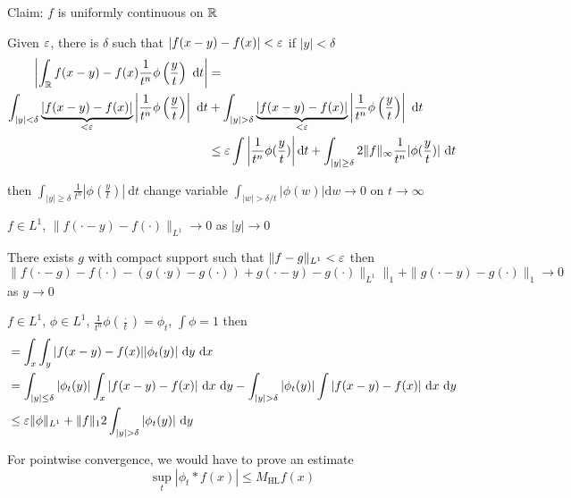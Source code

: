 Claim: $f$ is uniformly continuous on $\mathbb R$

Given $\varepsilon$, there is $\delta$ such that $|f(x-y) - f(x)| < \varepsilon$ if $|y| < \delta$
\begin{align*}
  \left|\int_\mathbb R f(x-y) - f(x) \frac1{t^n} \phi\left(\frac yt\right) \ \mathrm{d}t\right| &= \\
  \int_{|y| < \delta} \underbrace{|f(x-y) - f(x)|}_{< \varepsilon} \left|\frac1{t^n} \phi\left(\frac yt\right)\right| \ \mathrm{d}t& + \int_{|y| > \delta} \underbrace{|f(x-y) - f(x)|}_{< \varepsilon} \left|\frac1{t^n} \phi\left(\frac yt\right)\right| \ \mathrm{d}t\\
  &\le \varepsilon \int \left|\frac1{t^n} \phi(\frac yt)\right| \mathrm{d}t + \int_{|y| \ge \delta} 2 \|f\|_{\infty} \frac{1}{t^n} |\phi(\frac yt)| \ \mathrm{d}t \\
\end{align*}

then $\int_{|y| \ge \delta} \frac1{t^n} |\phi(\frac yt)| \ \mathrm{d}t$ change variable
$\int_{|w| > \delta /t} |\phi(w)| \mathrm{d}w \to 0$ on $t \to \infty$

$f \in L^1$, $\|f(\cdot - y) - f(\cdot)\|_{L^1} \to 0$ as $|y| \to 0$

There exists $g$ with compact support such that $\|f-g\|_{L^1} < \varepsilon$
then 
\[\|f(\cdot - g) - f(\cdot) -(g(\cdot y) - g(\cdot)) + g(\cdot -y) - g(\cdot)\|_{L^1}\|_1 + \|g(\cdot-y)-g(\cdot)\|_1 \to 0\]
as $y\to0$

$f \in L^1$, $\phi \in L^1$, $\frac 1{t^n} \phi(\frac\cdot{t}) = \phi_t$, $\int \phi = 1$
then 
\begin{align*}
  &= \int_x\int_y |f(x-y) - f(x)||\phi_t(y)| \ \mathrm{d}y \ \mathrm{d}x \\
  &= \int_{|y| \le \delta} |\phi_t(y)| \int_x |f(x-y) - f(x)| \ \mathrm{d}x \ \mathrm{d}y - \int_{|y| > \delta} |\phi_t(y)| \int |f(x-y) - f(x)| \ \mathrm{d}x \ \mathrm{d}y \\
  &\le \varepsilon \|\phi\|_{L^1} + \|f\|_12\int_{|y| > \delta} |\phi_t(y)| \ \mathrm{d}y
\end{align*}

For pointwise convergence, we would have to prove an estimate 
\[\sup_t |\phi_t * f(x)|\le M_{\mathrm{HL}}f(x)\]
